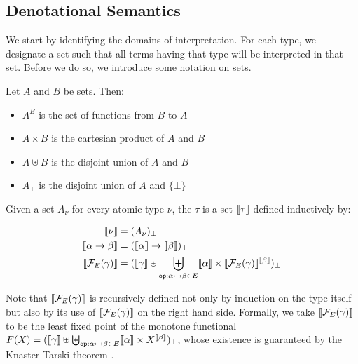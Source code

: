 \subsection{Denotational Semantics}
\label{ssec:denotational-semantics}

We start by identifying the domains of interpretation. For each type, we
designate a set such that all terms having that type will be interpreted in
that set. Before we do so, we introduce some notation on sets.

\begin{notation}
  Let $A$ and $B$ be sets. Then:

  \begin{itemize}
  \item $A^B$ is the set of functions from $B$ to $A$
  \item $A \times B$ is the cartesian product of $A$ and $B$
  \item $A \uplus B$ is the disjoint union of $A$ and $B$
  \item $A_\bot$ is the disjoint union of $A$ and $\{\bot\}$
  \end{itemize}
\end{notation}

\begin{definition}
  Given a set $A_\nu$ for every atomic type $\nu$, the
   $\tau$ is a set $\llbracket \tau \rrbracket$ defined
  inductively by:
  
  \begin{align*}
    \llbracket \nu \rrbracket &= (A_\nu)_\bot \\
    \llbracket \alpha \to \beta \rrbracket &= (\llbracket \alpha \rrbracket \to \llbracket \beta \rrbracket)_\bot \\
    \llbracket \mathcal{F}_E(\gamma) \rrbracket &=
      (\llbracket \gamma \rrbracket \uplus \biguplus_{\mathtt{op} : \alpha \rightarrowtail \beta \in E} \llbracket \alpha \rrbracket \times \llbracket \mathcal{F}_E(\gamma) \rrbracket^{\llbracket \beta \rrbracket})_\bot
  \end{align*}
  
  Note that $\llbracket \mathcal{F}_E(\gamma) \rrbracket$ is recursively defined not only by
  induction on the type itself but also by its use of $\llbracket \mathcal{F}_E(\gamma) \rrbracket$
  on the right hand side. Formally, we take $\llbracket \mathcal{F}_E(\gamma) \rrbracket$ to be the
  least fixed point of the monotone functional
  $F(X) = (\llbracket \gamma \rrbracket \uplus \biguplus_{\mathtt{op} : \alpha \rightarrowtail \beta \in
    E} \llbracket \alpha \rrbracket \times X^{\llbracket \beta \rrbracket})_\bot$, whose existence is
  guaranteed by the Knaster-Tarski theorem
  \cite{knaster1928theoreme,tarski1955lattice}.
\end{definition}

